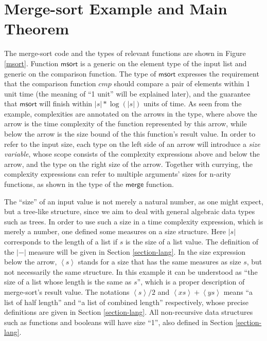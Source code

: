 \documentclass[preprint]{sigplanconf}
\newcommand{\symmerge}{\mathsf{merge}}
\newcommand{\symmsort}{\mathsf{msort}}
\newcommand{\Sstats}[1]{\left \langle #1 \right \rangle}
\begin{document}
\section{\label{section-example}Merge-sort Example and Main Theorem}

The merge-sort code and the types of relevant functions are shown in Figure \ref{msort}. Function $\symmsort$ is a generic on the element type of the input list and generic on the comparison function. The type of $\symmsort$ expresses the requirement that the comparison function $cmp$ should compare a pair of elements within 1 unit time (the meaning of ``1 unit'' will be explained later), and the guarantee that $\symmsort$ will finish within $|s|*\log(|s|)$ units of time. As seen from the example, complexities are annotated on the arrows in the type, where above the arrow is the time complexity of the function represented by this arrow, while below the arrow is the size bound of the this function's result value. In order to refer to the input size, each type on the left side of an arrow will introduce a \emph{size variable}, whose scope consists of the complexity expressions above and below the arrow, and the type on the right size of the arrow. Together with currying, the complexity expressions can refer to multiple arguments' sizes for n-arity functions, as shown in the type of the $\symmerge$ function.

The ``size'' of an input value is not merely a natural number, as one might expect, but a tree-like structure, since we aim to deal with general algebraic data types such as trees. In order to use such a size in a time complexity expression, which is merely a number, one defined some measures on a size structure. Here $|s|$ corresponds to the length of a list if $s$ is the size of a list value. The definition of the $|-|$ measure will be given in Section \ref{section-lang}. In the size expression below the arrow, $\Sstats{s}$ stands for a size that has the same measures as size $s$, but not necessarily the same structure. In this example it can be understood as ``the size of a list whose length is the same as $s$'', which is a proper description of merge-sort's result value.  The notations $\Sstats{s}/2$ and $\Sstats{xs}+\Sstats{ys}$ means ``a list of half length'' and ``a list of combined length'' respectively, whose precise definitions are given in Section \ref{section-lang}. All non-recursive data structures such as functions and booleans will have size ``1'', also defined in Section \ref{section-lang}.
\end{document}
